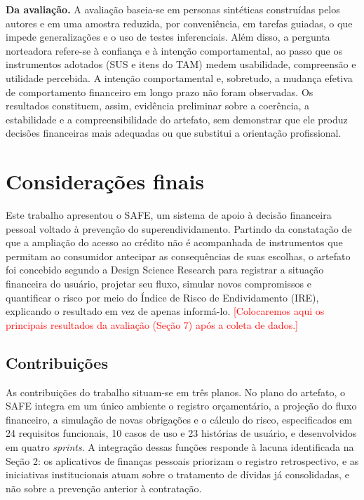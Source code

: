 \documentclass[portuguese]{sbc2025}%
\newcommand{\todo}[1]{\textcolor{red}{[#1]}}
\begin{document}
\textbf{Da avaliação.} A avaliação baseia-se em personas sintéticas construídas pelos autores e em uma amostra reduzida, por conveniência, em tarefas guiadas, o que impede generalizações e o uso de testes inferenciais. Além disso, a pergunta norteadora refere-se à confiança e à intenção comportamental, ao passo que os instrumentos adotados (SUS e itens do TAM) medem usabilidade, compreensão e utilidade percebida. A intenção comportamental e, sobretudo, a mudança efetiva de comportamento financeiro em longo prazo não foram observadas. Os resultados constituem, assim, evidência preliminar sobre a coerência, a estabilidade e a compreensibilidade do artefato, sem demonstrar que ele produz decisões financeiras mais adequadas ou que substitui a orientação profissional.


\section{Considerações finais}
\label{sec:consideracoes}

Este trabalho apresentou o SAFE, um sistema de apoio à decisão financeira pessoal voltado à prevenção do superendividamento. Partindo da constatação de que a ampliação do acesso ao crédito não é acompanhada de instrumentos que permitam ao consumidor antecipar as consequências de suas escolhas, o artefato foi concebido segundo a Design Science Research para registrar a situação financeira do usuário, projetar seu fluxo, simular novos compromissos e quantificar o risco por meio do Índice de Risco de Endividamento (IRE), explicando o resultado em vez de apenas informá-lo. \todo{Colocaremos aqui os principais resultados da avaliação (Seção 7) após a coleta de dados.}

\subsection{Contribuições}

As contribuições do trabalho situam-se em três planos. No plano do artefato, o SAFE integra em um único ambiente o registro orçamentário, a projeção do fluxo financeiro, a simulação de novas obrigações e o cálculo do risco, especificados em 24 requisitos funcionais, 10 casos de uso e 23 histórias de usuário, e desenvolvidos em quatro \textit{sprints}. A integração dessas funções responde à lacuna identificada na Seção 2: os aplicativos de finanças pessoais priorizam o registro retrospectivo, e as iniciativas institucionais atuam sobre o tratamento de dívidas já consolidadas, e não sobre a prevenção anterior à contratação.
\end{document}

